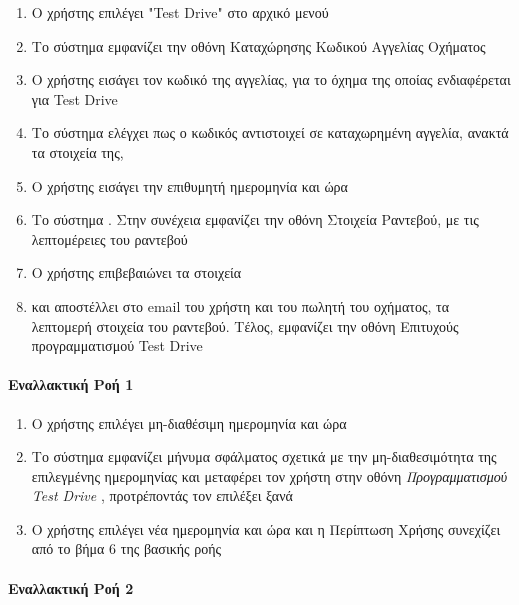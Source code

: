 \documentclass{../ol-softwaremanual}
\begin{document}
	\begin{enumerate}
		\item Ο χρήστης επιλέγει \en"Test Drive" \gr στο αρχικό μενού
		\item Το σύστημα εμφανίζει την οθόνη Καταχώρησης Κωδικού Αγγελίας Οχήματος
		\item Ο χρήστης εισάγει τον κωδικό της αγγελίας, για το όχημα της οποίας ενδιαφέρεται για \en Test Drive \gr
		\item Το σύστημα ελέγχει πως ο κωδικός αντιστοιχεί σε καταχωρημένη αγγελία, ανακτά τα στοιχεία της,  
		\item Ο χρήστης εισάγει την επιθυμητή ημερομηνία και ώρα		
		\item Το σύστημα . Στην συνέχεια εμφανίζει την οθόνη Στοιχεία Ραντεβού, με τις λεπτομέρειες του ραντεβού
		\item Ο χρήστης επιβεβαιώνει τα στοιχεία
		\item {} και αποστέλλει στο \en email \gr του χρήστη και του πωλητή του οχήματος, τα λεπτομερή στοιχεία του ραντεβού. Τέλος, εμφανίζει την οθόνη Επιτυχούς προγραμματισμού \en Test Drive \gr 
	\end{enumerate}
	
	\paragraph{Εναλλακτική Ροή 1}
	
	\begin{enumerate}
		\item Ο χρήστης επιλέγει μη-διαθέσιμη ημερομηνία και ώρα
		\item Το σύστημα εμφανίζει μήνυμα σφάλματος σχετικά με την μη-διαθεσιμότητα της επιλεγμένης ημερομηνίας και μεταφέρει τον χρήστη στην οθόνη \textit{Προγραμματισμού \en Test Drive \gr}, προτρέποντάς τον επιλέξει ξανά
		\item Ο χρήστης επιλέγει νέα ημερομηνία και ώρα και η Περίπτωση Χρήσης συνεχίζει από το βήμα 6 της βασικής ροής
	\end{enumerate}
	
	
	\paragraph{Εναλλακτική Ροή 2}
	
\end{document}

